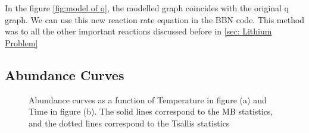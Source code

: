 \documentclass[11pt]{article}
\numberwithin{equation}{section}
\begin{document}
In the figure \ref{fig:model of q}, the modelled graph coincides with the original q graph. We can use this new reaction rate equation in the BBN code. This method was to all the other important reactions discussed before in \ref{sec: Lithium Problem}

\subsection{Abundance Curves}
\begin{figure}[H]
	\centering
	\caption{Abundance curves as a function of Temperature in figure (a) and Time in figure (b). The solid lines correspond to the MB statistics, and the dotted lines correspond to the Tsallis statistics}
	\label{difference}
\end{figure}
\end{document}
